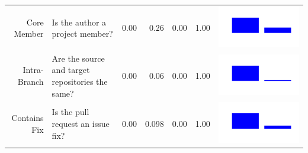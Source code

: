 \documentclass[conference]{IEEEtran}
\begin{document}
\begin{table}[ht]
\begin{tabular}{rp{26em}rrrrc}
    Core Member & Is the author a project member? & 0.00 & 0.26 & 0.00 & 1.00 & \includegraphics[scale = 0.09, clip = true, trim= 50px 60px 50px 60px]{../figs/hist-features/hist-coreMember.pdf} \\
    Intra-Branch & Are the source and target repositories the same? & 0.00 & 0.06 & 0.00 & 1.00 & \includegraphics[scale = 0.09, clip = true, trim= 50px 60px 50px 60px]{../figs/hist-features/hist-intraBranch.pdf} \\
    Contains Fix & Is the pull request an issue fix? & 0.00 & 0.098 & 0.00 & 1.00 & \includegraphics[scale = 0.1, clip = true, trim= 50px 60px 50px 60px]{../figs/hist-features/hist-containsFix.pdf} \\

\end{tabular}
\end{table}
\end{document}
